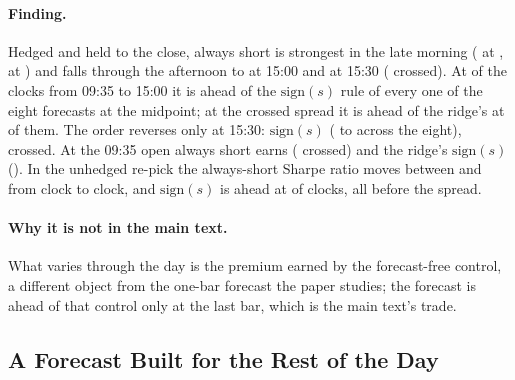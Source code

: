 \paragraph{Finding.} Hedged and held to the close, always short is strongest
in the late morning (\runappPcAsPeak{} at \runappPcAsPeakClock{},
\runappPcAsSecond{} at \runappPcAsSecondClock{}) and falls through the
afternoon to \runappPcAsFifteen{} at 15:00 and \runappPcAsLast{} at 15:30
(\runappPcAsLastX{} crossed). At \runappPcAsBeatsAll{} of the
\runappPcDayClocks{} clocks from 09:35 to 15:00 it is ahead of the
$\mathrm{sign}(s)$ rule of every one of the eight forecasts at the midpoint;
at the crossed spread it is ahead of the ridge's at \runappPcAsBeatsAllX{} of
them. The order reverses only at 15:30: $\mathrm{sign}(s)$ \runappPcSgLast{}
(\runappPcSgLastLo{} to \runappPcSgLastHi{} across the eight), \runappPcSgLastX{}
crossed. At the 09:35 open always short earns \runappPcAsFirst{}
(\runappPcAsFirstX{} crossed) and the ridge's $\mathrm{sign}(s)$
\runappPcSgFirst{} (\runappPcSgFirstX{}). In the unhedged re-pick the
always-short Sharpe ratio moves between \runappPcRpAsLo{} and \runappPcRpAsHi{}
from clock to clock, and $\mathrm{sign}(s)$ is ahead at \runappPcRpSgBeats{}
of \runappPcRpClocks{} clocks, all before the spread.

\paragraph{Why it is not in the main text.} What varies through the day is the
premium earned by the forecast-free control, a different object from the
one-bar forecast the paper studies; the forecast is ahead of that control only
at the last bar, which is the main text's trade.

\subsection{A Forecast Built for the Rest of the Day}
\label{sec:app_run_restofday}

